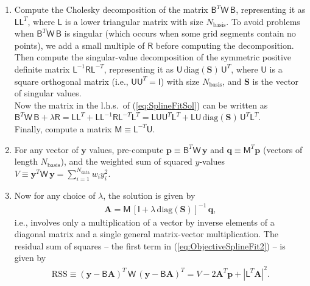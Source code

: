 \documentclass[12pt]{article}
\newcommand{\bA}{\boldsymbol{A}}
\newcommand{\by}{\boldsymbol{y}}
\begin{document}
\begin{enumerate}
\item Compute the Cholesky decomposition of the matrix $\mathsf{B}^T\mathsf{W\,B}$, representing it as $\mathsf{L}\mathsf{L}^T$, where $\mathsf{L}$ is a lower triangular matrix with size $N_\mathrm{basis}$. To avoid problems when $\mathsf{B}^T\mathsf{W\,B}$ is singular (which occurs when some grid segments contain no points), we add a small multiple of $\mathsf{R}$ before computing the decomposition.\\
Then compute the singular-value decomposition of the symmetric positive definite matrix $\mathsf{L}^{-1} \mathsf{R} \mathsf{L}^{-T}$, representing it as $\mathsf{U}\, \mathrm{diag}(\boldsymbol{S})\, \mathsf{U}^T$, where $\mathsf{U}$ is a square orthogonal matrix (i.e., $\mathsf{U}\mathsf{U}^T=\mathsf{I}$) with size $N_\mathrm{basis}$, and $\boldsymbol{S}$ is the vector of singular values.\\
Now the matrix in the l.h.s.\ of (\ref{eq:SplineFitSol}) can be written as\\
$\mathsf{B}^T\mathsf{W\,B}+\lambda \mathsf{R} = \mathsf{L} \mathsf{L}^T + \mathsf{L} \mathsf{L}^{-1} \mathsf{R} \mathsf{L}^{-T} \mathsf{L}^T = \mathsf{L} \mathsf{U} \mathsf{U}^T \mathsf{L}^T + \mathsf{L} \mathsf{U}\, \mathrm{diag}(\boldsymbol{S})\, \mathsf{U}^T \mathsf{L}^T$.\\
Finally, compute a matrix $\mathsf{M}\equiv \mathsf{L}^{-T}\mathsf{U}$.
\item For any vector of $\by$ values, pre-compute $\boldsymbol{p}\equiv \mathsf{B}^T\mathsf{W}\,\by$ and $\boldsymbol{q}\equiv \mathsf{M}^T\boldsymbol{p}$ (vectors of length $N_\mathrm{basis}$), and the weighted sum of squared $y$-values $V\equiv \by^T \mathsf{W}\,\by = \sum_{i=1}^{N_\mathrm{data}} w_i y_i^2$.
\item Now for any choice of $\lambda$, the solution is given by
\begin{align}
\bA = \mathsf{M}\, [\mathsf{I}+\lambda\,\mathrm{diag}(\boldsymbol{S})]^{-1}\,\boldsymbol{q},
\end{align}
i.e., involves only a multiplication of a vector by inverse elements of a diagonal matrix and a single general matrix-vector multiplication.
The residual sum of squares -- the first term in (\ref{eq:ObjectiveSplineFit2}) -- is given by
\begin{align}
\mathrm{RSS} \equiv (\by - \mathsf{B}\bA)^T\,\mathsf{W}\,(\by - \mathsf{B}\bA)^T =
V - 2\bA^T\boldsymbol{p} + |\mathsf{L}^T\bA|^2.
\end{align}
\end{enumerate}
\end{document}

